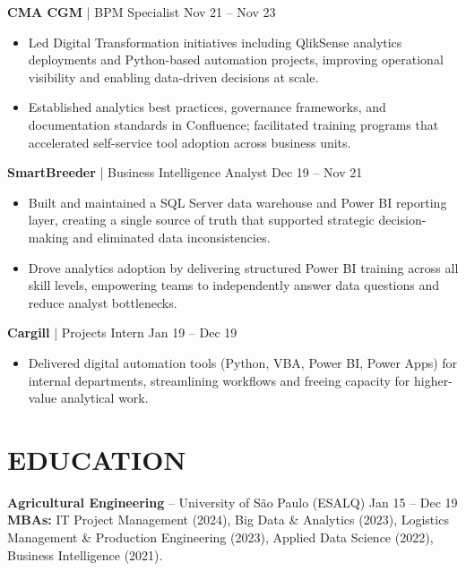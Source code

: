 \documentclass[9pt, letterpaper]{article}
\begin{document}
	\noindent \textbf{CMA CGM} | BPM Specialist \hfill Nov 21 -- Nov 23
	\begin{itemize}[noitemsep, topsep=0pt, leftmargin=1.5em, rightmargin=0.5cm]
		\item Led Digital Transformation initiatives including QlikSense analytics deployments and Python-based automation projects, improving operational visibility and enabling data-driven decisions at scale.
		\item Established analytics best practices, governance frameworks, and documentation standards in Confluence; facilitated training programs that accelerated self-service tool adoption across business units.
	\end{itemize}

	\noindent \textbf{SmartBreeder} | Business Intelligence Analyst \hfill Dec 19 -- Nov 21
	\begin{itemize}[noitemsep, topsep=0pt, leftmargin=1.5em, rightmargin=0.5cm]
		\item Built and maintained a SQL Server data warehouse and Power BI reporting layer, creating a single source of truth that supported strategic decision-making and eliminated data inconsistencies.
		\item Drove analytics adoption by delivering structured Power BI training across all skill levels, empowering teams to independently answer data questions and reduce analyst bottlenecks.
	\end{itemize}

	\noindent \textbf{Cargill} | Projects Intern \hfill Jan 19 -- Dec 19
	\begin{itemize}[noitemsep, topsep=0pt, leftmargin=1.5em, rightmargin=0.5cm]
		\item Delivered digital automation tools (Python, VBA, Power BI, Power Apps) for internal departments, streamlining workflows and freeing capacity for higher-value analytical work.
	\end{itemize}

	\section*{EDUCATION}
	\noindent \textbf{Agricultural Engineering} -- University of S\~{a}o Paulo (ESALQ) \hfill Jan 15 -- Dec 19 \\
	\noindent \textbf{MBAs:} IT Project Management (2024), Big Data \& Analytics (2023), Logistics Management \& Production Engineering (2023), Applied Data Science (2022), Business Intelligence (2021).
\end{document}
